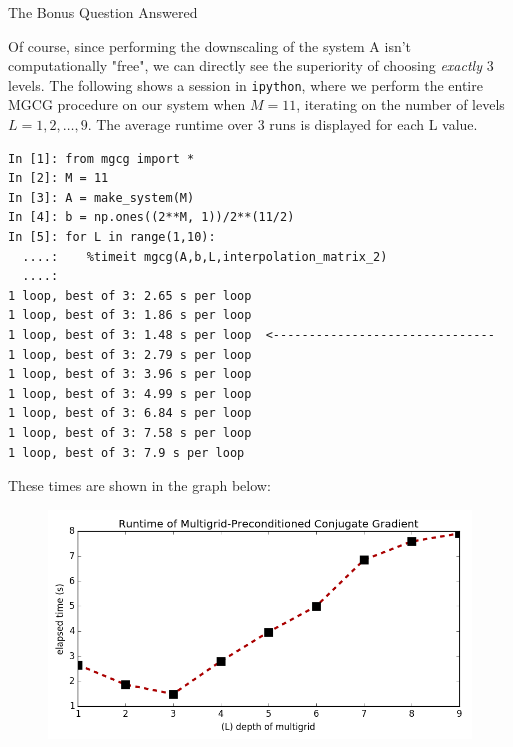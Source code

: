\documentclass[10pt]{article}
\theoremstyle{definition}
\begin{document}
\begin{section}{The Bonus Question Answered}


Of course, since performing the downscaling of the system A isn't computationally "free", we can directly see the superiority of choosing \textit{exactly} 3 levels. The following shows a session in \texttt{ipython}, where we perform the entire MGCG procedure on our system when $M=11$, iterating on the number of levels $L=1,2,\dots,9$. The average runtime over 3 runs is displayed for each L value. 
\begin{verbatim}
In [1]: from mgcg import * 
In [2]: M = 11
In [3]: A = make_system(M)
In [4]: b = np.ones((2**M, 1))/2**(11/2)
In [5]: for L in range(1,10):
  ....:    %timeit mgcg(A,b,L,interpolation_matrix_2)
  ....:     
1 loop, best of 3: 2.65 s per loop
1 loop, best of 3: 1.86 s per loop
1 loop, best of 3: 1.48 s per loop	<-------------------------------
1 loop, best of 3: 2.79 s per loop
1 loop, best of 3: 3.96 s per loop
1 loop, best of 3: 4.99 s per loop
1 loop, best of 3: 6.84 s per loop
1 loop, best of 3: 7.58 s per loop
1 loop, best of 3: 7.9 s per loop
\end{verbatim}

These times are shown in the graph below:
\begin{figure}[p]
\begin{center}
\includegraphics[width=0.8\linewidth]{runtimes.png}
\end{center}
\end{figure}
\end{section}
\end{document}
